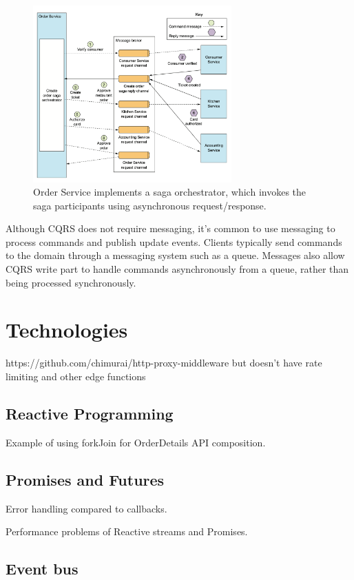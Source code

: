 \documentclass[conference]{IEEEtran}
\begin{document}
\begin{figure}[!htbp]
\centering
\includegraphics[width=3in]{jpeg/orchestrator-saga}
\caption{Order Service implements a saga orchestrator, which invokes the saga participants using asynchronous request/response. \cite{microservices-patterns-saga}}
\label{orchestrator_saga}
\end{figure}

Although CQRS does not require messaging, it's common to use messaging to process commands and publish update events.
Clients typically send commands to the domain through a messaging system such as a queue.
Messages also allow CQRS write part to handle commands asynchronously from a queue, rather than being processed synchronously.

\section{Technologies}

https://github.com/chimurai/http-proxy-middleware but doesn't have rate limiting and other edge functions

\subsection{Reactive Programming}

Example of using forkJoin for OrderDetails API composition.

\subsection{Promises and Futures}

Error handling compared to callbacks.

Performance problems of Reactive streams and Promises.

\subsection{Event bus}
\end{document}
